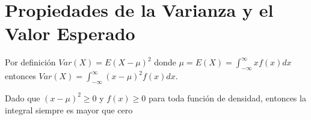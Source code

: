 \section{Propiedades de la Varianza y el Valor Esperado}

\begin{Demo}
    Por definición $Var(X) = E(X - \mu)^2$ donde $\mu = E(X) = \int_{-\infty}^{\infty}xf(x)dx$ 
    entonces $Var(X) = \int_{-\infty}^{\infty}(x-\mu)^2 f(x)dx$.

    Dado que $(x-\mu)^2 \geq 0$ y $f(x) \geq 0$ para toda función de densidad, entonces
    la integral siempre es mayor que cero
\end{Demo}
\clearpage
